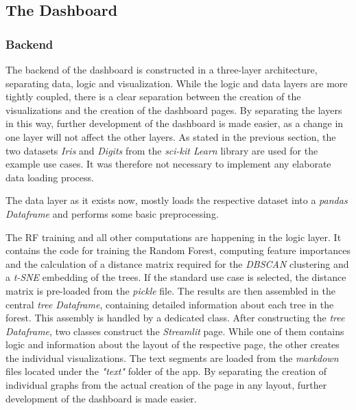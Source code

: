 \documentclass[a4paper, 12pt]{article}
\begin{document}
\subsection{The Dashboard}
\subsubsection{Backend}
The backend of the dashboard is constructed in a three-layer architecture, separating data,
logic and visualization. While the logic and data layers are more tightly coupled, there is
a clear separation between the creation of the visualizations and the creation of the
dashboard pages. By separating the layers in this way, further development of the dashboard is
made easier, as a change in one layer will not affect the other layers. As stated in the
previous section, the two datasets \textit{Iris} and \textit{Digits} from the
\textit{sci-kit Learn} library are used for the example use cases. It was therefore not
necessary to implement any elaborate data loading process. \par
The data layer as it exists now, mostly loads the respective dataset into a
\textit{pandas Dataframe} and performs some basic preprocessing. \par
The RF training and all other computations are happening in the logic layer. It
contains the code for training the Random Forest, computing feature importances and the calculation
of a distance matrix required for the \textit{DBSCAN} clustering and a\textit{ t-SNE} embedding
of the trees. If the standard use case is selected, the distance matrix is pre-loaded from the
\textit{pickle} file. The results are then assembled in the central \textit{tree Dataframe}, containing
detailed information about each tree in the forest. This assembly is handled by a dedicated class.
After constructing the \textit{tree Dataframe}, two classes construct the \textit{Streamlit} page.
While one of them contains logic and information about the layout of the respective page, the other
creates the individual visualizations. The text segments are loaded from the \textit{markdown} files
located under the \textit{"text"} folder of the app. By separating the creation of individual graphs
from the actual creation of the page in any layout, further development of the dashboard is made
easier.
\end{document}
